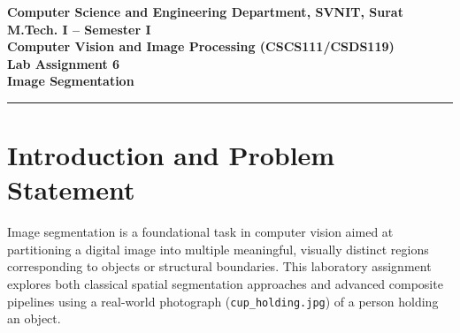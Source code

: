 \documentclass[12pt]{article}
\begin{document}

\begin{center}
\textbf{Computer Science and Engineering Department, SVNIT, Surat}\\
\textbf{M.Tech. I -- Semester I}\\
\textbf{Computer Vision and Image Processing (CSCS111/CSDS119)}\\
\textbf{Lab Assignment 6}\\
\textbf{Image Segmentation}
\end{center}
\vspace{-4pt}
\hrule
\vspace{4pt}

\section{Introduction and Problem Statement}

Image segmentation is a foundational task in computer vision aimed at partitioning a digital image into multiple meaningful, visually distinct regions corresponding to objects or structural boundaries. This laboratory assignment explores both classical spatial segmentation approaches and advanced composite pipelines using a real-world photograph (\texttt{cup\_holding.jpg}) of a person holding an object.
\end{document}
